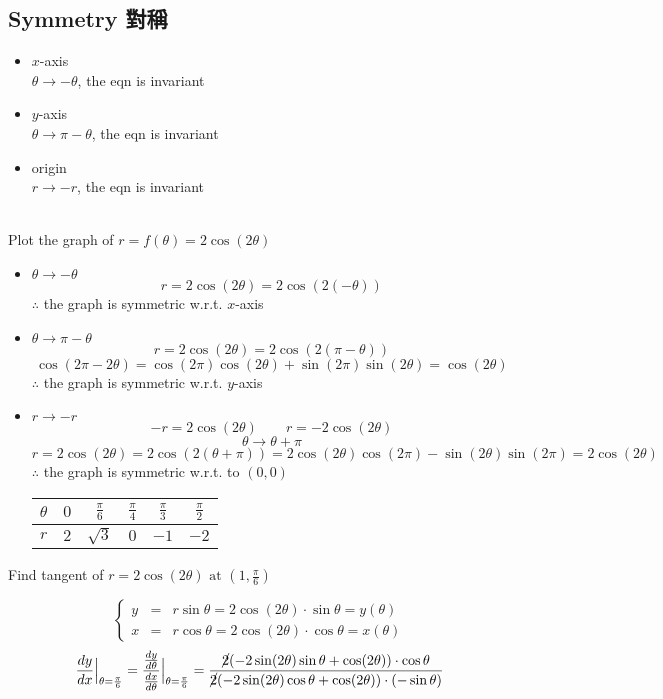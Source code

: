 \subsection*{Symmetry 對稱}
\begin{itemize}
\item \(x\)-axis\\
\(\theta \to -\theta\), the eqn is invariant 
\item \(y\)-axis\\
\(\theta \to \pi - \theta\), the eqn is invariant 
\item origin\\
\( r \to -r\), the eqn is invariant\\\\
\end{itemize}
\begin{eg}
Plot the graph of \(r = f(\theta) = 2 \cos(2\theta)\)
\begin{itemize}
\item \(\theta \to - \theta\)
\[r = 2 \cos(2\theta) = 2 \cos(2(-\theta))\]
\(\therefore\) the graph is symmetric w.r.t. \(x\)-axis
\item \(\theta \to \pi - \theta\)
\[r = 2 \cos(2\theta) = 2 \cos(2 (\pi - \theta))\]
\[\cos(2\pi - 2\theta) = \cos (2\pi) \cos(2\theta) + \sin (2\pi) \sin(2\theta) = \cos (2\theta)\]
\(\therefore\) the graph is symmetric w.r.t. \(y\)-axis
\item \(r \to -r\)
\[-r = 2 \cos (2\theta)  \quad \quad r = -2 \cos (2\theta)\]
\[\theta \to \theta + \pi\]
\[r = 2\cos (2\theta) = 2 \cos(2(\theta + \pi)) = 2\cos(2\theta) \cos(2\pi) - \sin(2\theta) \sin(2\pi) = 2 \cos (2\theta)\]
\(\therefore\) the graph is symmetric w.r.t. to \((0, 0)\)
\begin{center}
\begin{tabular}{c|c|c|c|c|c}
\(\theta\) & \(0\) & \(\displaystyle \frac{\pi}{6}\) & \(\displaystyle \frac{\pi}{4}\) & \(\displaystyle \frac{\pi}{3}\) & \(\displaystyle \frac{\pi}{2}\)\\ \hline
\(r\) & \(2\) & \(\sqrt{3}\) & \(0\) & \(-1\) & \(-2\)
\end{tabular}
\end{center}
\end{itemize}
\end{eg}
\begin{eg}
Find tangent of \(\displaystyle r = 2\cos (2\theta) \text{ at } (1, \frac{\pi}{6})\)

\soln
\[\left\{\begin{array}{rcl}
y & = & r \sin \theta = 2\cos (2\theta) \cdot \sin \theta = y(\theta)\\
x & = & r \cos \theta = 2\cos (2\theta) \cdot \cos \theta = x(\theta)
\end{array}\right.\]
\[\displaystyle \frac{dy}{dx} \Big|_{\theta = \frac{\pi}{6}} = \frac{\frac{dy}{d\theta}}{\frac{dx}{d\theta}} \Big|_{\theta = \frac{\pi}{6}} = \frac{\cancel{2}(-2\sin (2\theta) \sin \theta + \cos(2\theta)) \cdot \cos \theta}{\cancel{2} (-2\sin (2\theta) \cos \theta + \cos(2\theta)) \cdot (-\sin \theta)}\]
\end{eg}
